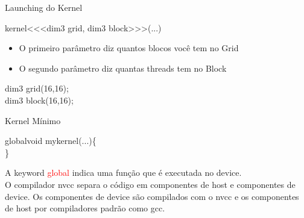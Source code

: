 \begin{frame}[t]{Launching do Kernel}
    \Large{
    \begin{shaded}
        kernel\textless \textless \textless dim3 grid, dim3 block\textgreater \textgreater \textgreater (...)
    \end{shaded}
    }
    \begin{itemize}
    \item O primeiro parâmetro diz quantos blocos você tem no Grid
    \item O segundo parâmetro diz quantas threads tem no Block
    \end{itemize}
    \begin{shaded}
        dim3 grid(16,16);\\
        dim3 block(16,16);\\
    \end{shaded}

\end{frame}
\begin{frame}[t]{Kernel Mínimo}
    \Large{
    \begin{shaded}

        \textunderscore \textunderscore  global\textunderscore \textunderscore void mykernel(...)\{\\
        \}
    \end{shaded}
    }
    \Large{
    A keyword \textcolor{red}{\textunderscore \textunderscore  global\textunderscore \textunderscore} indica uma função que é executada no device.\\ %
    O compilador nvcc separa o código em componentes de host e componentes de device. Os componentes de device são compilados com o nvcc e os componentes de host por compiladores padrão como gcc.
    }
    
\end{frame}
